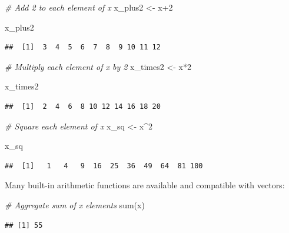 \documentclass[
]{book}
\newenvironment{Shaded}{\begin{snugshade}}{\end{snugshade}}
\newcommand{\CommentTok}[1]{\textcolor[rgb]{0.56,0.35,0.01}{\textit{#1}}}
\newcommand{\DecValTok}[1]{\textcolor[rgb]{0.00,0.00,0.81}{#1}}
\newcommand{\FunctionTok}[1]{\textcolor[rgb]{0.00,0.00,0.00}{#1}}
\newcommand{\NormalTok}[1]{#1}
\newcommand{\OtherTok}[1]{\textcolor[rgb]{0.56,0.35,0.01}{#1}}
\newcommand{\SpecialCharTok}[1]{\textcolor[rgb]{0.00,0.00,0.00}{#1}}
\begin{document}
\begin{Shaded}
\begin{Highlighting}[]
\CommentTok{\# Add 2 to each element of x}
\NormalTok{x\_plus2 }\OtherTok{\textless{}{-}}\NormalTok{ x}\SpecialCharTok{+}\DecValTok{2}

\NormalTok{x\_plus2}
\end{Highlighting}
\end{Shaded}

\begin{verbatim}
##  [1]  3  4  5  6  7  8  9 10 11 12
\end{verbatim}

\begin{Shaded}
\begin{Highlighting}[]
\CommentTok{\# Multiply each element of x by 2}
\NormalTok{x\_times2 }\OtherTok{\textless{}{-}}\NormalTok{ x}\SpecialCharTok{*}\DecValTok{2}

\NormalTok{x\_times2}
\end{Highlighting}
\end{Shaded}

\begin{verbatim}
##  [1]  2  4  6  8 10 12 14 16 18 20
\end{verbatim}

\begin{Shaded}
\begin{Highlighting}[]
\CommentTok{\# Square each element of x}
\NormalTok{x\_sq }\OtherTok{\textless{}{-}}\NormalTok{ x}\SpecialCharTok{\^{}}\DecValTok{2}

\NormalTok{x\_sq}
\end{Highlighting}
\end{Shaded}

\begin{verbatim}
##  [1]   1   4   9  16  25  36  49  64  81 100
\end{verbatim}

Many built-in arithmetic functions are available and compatible with vectors:

\begin{Shaded}
\begin{Highlighting}[]
\CommentTok{\# Aggregate sum of x elements}
\FunctionTok{sum}\NormalTok{(x)}
\end{Highlighting}
\end{Shaded}

\begin{verbatim}
## [1] 55
\end{verbatim}
\end{document}
